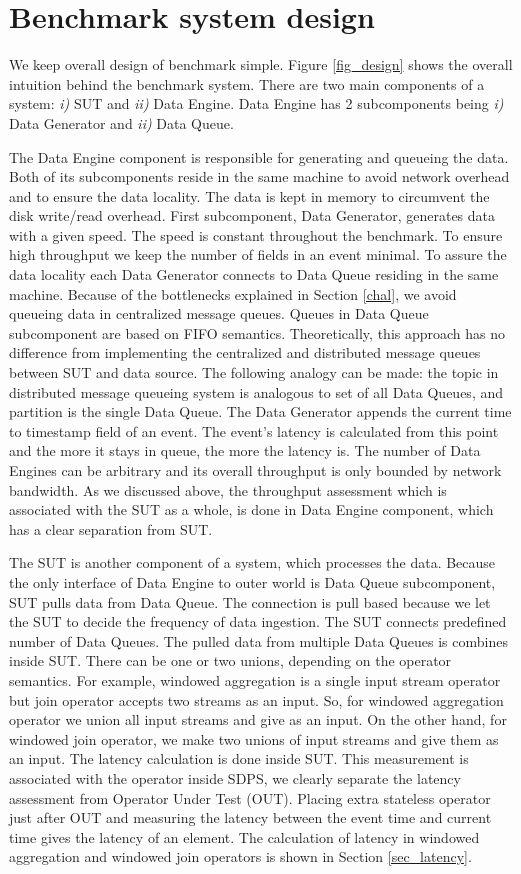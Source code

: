 \section{Benchmark system design}
\label{des}
We keep overall design of benchmark simple. Figure \ref{fig_design} shows the overall intuition behind the benchmark system. There are two main components of a system: \textit{i)} SUT and \textit{ii)} Data Engine. Data Engine has 2 subcomponents being \textit{i)} Data Generator and \textit{ii)} Data Queue.

The Data Engine component is responsible for generating and queueing the data. Both of its subcomponents reside in the same machine to avoid network overhead and to ensure the data locality. The data is kept in memory to circumvent the disk write/read overhead. First subcomponent, Data Generator, generates data with a given speed. The speed is constant throughout the benchmark.  To ensure high throughput we keep the number of fields in an event minimal. To assure the data locality  each Data Generator connects to Data Queue residing in the same machine. Because of the bottlenecks explained in Section \ref{chal}, we avoid queueing data in  centralized message queues. Queues in Data Queue subcomponent are based on FIFO semantics. Theoretically, this approach has no difference from implementing the  centralized and distributed message queues between SUT and data source. The following analogy can be made: the topic in distributed message queueing system is analogous to set of all Data Queues, and partition is the single Data Queue. The Data Generator appends the current time to timestamp field of an event. The event's latency is calculated from this point and the more it stays in queue, the more the latency is. The number of Data Engines can be arbitrary and its overall throughput is only bounded by network bandwidth. As we discussed above, the throughput assessment which is associated with the SUT as a whole,  is done in Data Engine component, which has a clear separation from SUT. 

The SUT is another component of a system, which processes the data.  Because the only interface of Data Engine to outer world is Data Queue subcomponent,  SUT pulls data from Data Queue. The connection is pull based because we let the SUT to decide the frequency of data ingestion. The SUT connects predefined number of Data Queues. The pulled data from multiple Data Queues is combines inside SUT. There can be one or two unions, depending on the operator semantics. For example, windowed aggregation is a single input stream operator but join operator accepts two streams  as an input. So, for windowed aggregation operator we union all input streams and give as an input. On the other hand, for windowed join operator, we make two unions of input streams and give them as an input.  The latency calculation is done inside SUT. This measurement is associated with the operator inside SDPS, we clearly separate the latency assessment from Operator Under Test (OUT). Placing extra stateless operator just after OUT and measuring the latency between the event time and current time gives the latency of an element. The calculation of latency in windowed aggregation and windowed join operators is shown in Section \ref{sec_latency}. 


